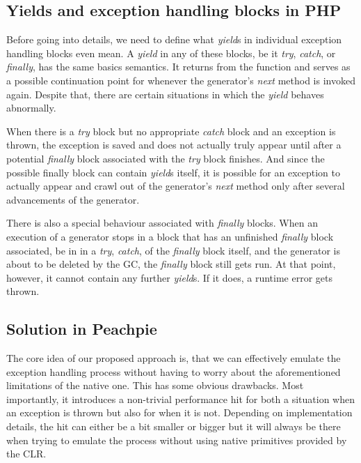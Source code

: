 \subsection{Yields and exception handling blocks in PHP}

Before going into details, we need to define what \emph{yield}s in individual exception handling blocks even mean. A \emph{yield} in any of these blocks, be it \emph{try}, \emph{catch}, or \emph{finally}, has the same basics semantics. It returns from the function and serves as a possible continuation point for whenever the generator’s \emph{next} method is invoked again. Despite that, there are certain situations in which the \emph{yield} behaves abnormally.

When there is a \emph{try} block but no appropriate \emph{catch} block and an exception is thrown, the exception is saved and does not actually truly appear until after a potential \emph{finally} block associated with the \emph{try} block finishes. And since the possible finally block can contain \emph{yield}s itself, it is possible for an exception to actually appear and crawl out of the generator’s \emph{next} method only after several advancements of the generator. 

There is also a special behaviour associated with \emph{finally} blocks. When an execution of a generator stops in a block that has an unfinished \emph{finally} block associated, be in in a \emph{try}, \emph{catch}, of the \emph{finally} block itself, and the generator is about to be deleted by the GC, the \emph{finally} block still gets run. At that point, however, it cannot contain any further \emph{yield}s. If it does, a runtime error gets thrown.

\subsection{Solution in Peachpie}

The core idea of our proposed approach is, that we can effectively emulate the exception handling process without having to worry about the aforementioned limitations of the native one. This has some obvious drawbacks. Most importantly, it introduces a non-trivial performance hit for both a situation when an exception is thrown but also for when it is not. Depending on implementation details, the hit can either be a bit smaller or bigger but it will always be there when trying to emulate the process without using native primitives provided by the CLR.

